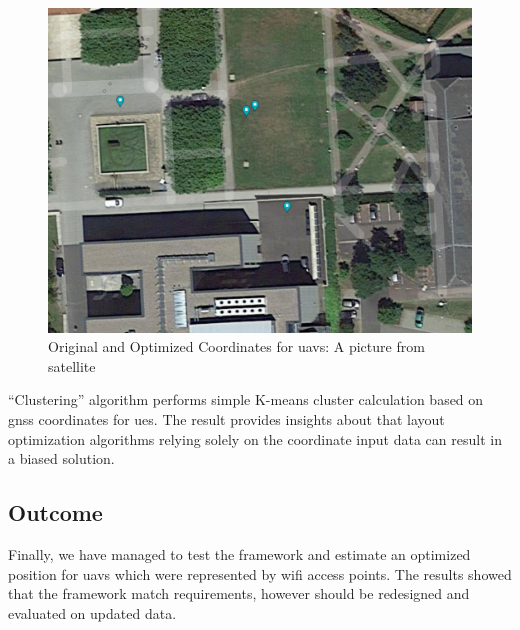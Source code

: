 \begin{figure}[H]
	\centering
	\includegraphics[width=\linewidth,keepaspectratio]{images/Expt4_Result_of_optimization_sattelite.png}
\caption{Original and Optimized Coordinates for \glspl{uav}: A picture from satellite}
\label{fig:optimized-coordinates-satellite-map}
\end{figure}

``Clustering'' algorithm performs simple K-means cluster calculation
based on \gls{gnss} coordinates for \glspl{ue}. The result provides insights about that layout optimization algorithms relying solely on the coordinate input data can result in a biased solution.

\subsection{Outcome}

Finally, we have managed to test the framework and estimate an optimized position for \glspl{uav} which were represented by \gls{wifi} access points. The results showed that the framework match requirements, however should be redesigned and evaluated on updated data.
